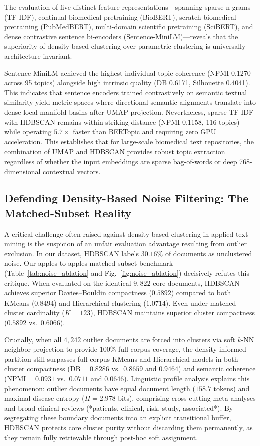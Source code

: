 \documentclass[a4paper,fleqn]{cas-dc}
\begin{document}
The evaluation of five distinct feature representations—spanning sparse n-grams (TF-IDF), continual biomedical pretraining (BioBERT), scratch biomedical pretraining (PubMedBERT), multi-domain scientific pretraining (SciBERT), and dense contrastive sentence bi-encoders (Sentence-MiniLM)—reveals that the superiority of density-based clustering over parametric clustering is universally architecture-invariant. 

Sentence-MiniLM achieved the highest individual topic coherence (NPMI 0.1270 across 95 topics) alongside high intrinsic quality (DB 0.6171, Silhouette 0.4041). This indicates that sentence encoders trained contrastively on semantic textual similarity yield metric spaces where directional semantic alignments translate into dense local manifold basins after UMAP projection. Nevertheless, sparse TF-IDF with HDBSCAN remains within striking distance (NPMI 0.1158, 116 topics) while operating $5.7\times$ faster than BERTopic and requiring zero GPU acceleration. This establishes that for large-scale biomedical text repositories, the combination of UMAP and HDBSCAN provides robust topic extraction regardless of whether the input embeddings are sparse bag-of-words or deep 768-dimensional contextual vectors.

\subsection{Defending Density-Based Noise Filtering: The Matched-Subset Reality}

A critical challenge often raised against density-based clustering in applied text mining is the suspicion of an unfair evaluation advantage resulting from outlier exclusion. In our dataset, HDBSCAN labels $30.16\%$ of documents as unclustered noise. Our apples-to-apples matched subset benchmark (Table~\ref{tab:noise_ablation} and Fig.~\ref{fig:noise_ablation}) decisively refutes this critique. When evaluated on the identical $9{,}822$ core documents, HDBSCAN achieves superior Davies--Bouldin compactness ($0.5892$) compared to both KMeans ($0.8494$) and Hierarchical clustering ($1.0714$). Even under matched cluster cardinality ($K=123$), HDBSCAN maintains superior cluster compactness ($0.5892$ vs.\ $0.6066$).

Crucially, when all $4{,}242$ outlier documents are forced into clusters via soft $k$-NN neighbor projection to provide $100\%$ full-corpus coverage, the density-informed partition still surpasses full-corpus KMeans and Hierarchical models in both cluster compactness ($\text{DB} = 0.8286$ vs.\ $0.8659$ and $0.9464$) and semantic coherence ($\text{NPMI} = 0.0931$ vs.\ $0.0711$ and $0.0646$). Linguistic profile analysis explains this phenomenon: outlier documents have equal document length ($158.7$ tokens) and maximal disease entropy ($H = 2.978$ bits), comprising cross-cutting meta-analyses and broad clinical reviews (*patients, clinical, risk, study, associated*). By segregating these boundary documents into an explicit transitional buffer, HDBSCAN protects core cluster purity without discarding them permanently, as they remain fully retrievable through post-hoc soft assignment.
\end{document}
